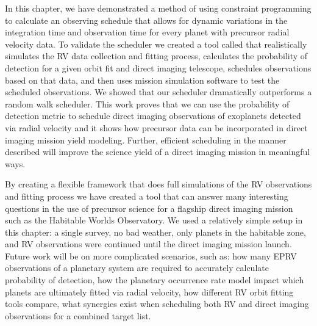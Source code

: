 In this chapter, we have demonstrated a method of using constraint programming
to calculate an observing schedule that allows for dynamic variations in the
integration time and observation time for every planet with precursor radial
velocity data. To validate the scheduler we created a tool called
 that realistically simulates the RV data collection and
fitting process, calculates the probability of detection for a given orbit fit
and direct imaging telescope, schedules observations based on that data, and
then uses mission simulation software to test the scheduled observations. We
showed that our scheduler dramatically outperforms a random walk scheduler.
This work proves that we can use the probability of detection metric to
schedule direct imaging observations of exoplanets detected via radial velocity
and it shows how precursor data can be incorporated in direct imaging mission
yield modeling. Further, efficient scheduling in the manner described will
improve the science yield of a direct imaging mission in meaningful ways.

By creating a flexible framework that does full simulations of the RV
observations and fitting process we have created a tool that can answer many
interesting questions in the use of precursor science for a flagship direct
imaging mission such as the Habitable Worlds Observatory. We used a relatively
simple setup in this chapter: a single survey, no bad weather, only
planets in the habitable zone, and RV observations were continued until the
direct imaging mission launch. Future work will be on more complicated
scenarios, such as: how many EPRV observations of a planetary system are
required to accurately calculate probability of detection, how the
planetary occurrence rate model impact which planets are ultimately fitted via
radial velocity, how different RV orbit fitting tools compare, what
synergies exist when scheduling both RV and direct imaging observations for a
combined target list.

